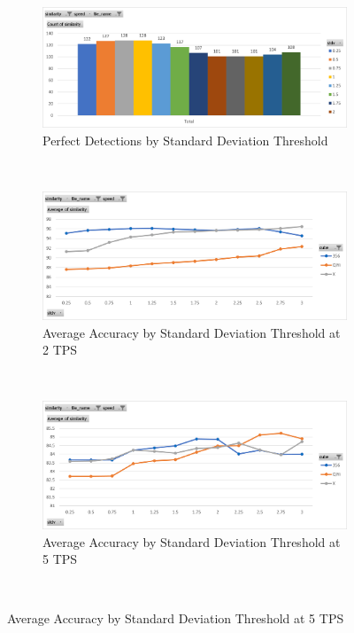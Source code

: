 \begin{figure}
    \caption{Influence of Standard Deviation Threshold on Accuracy}
    \label{fig:influence-stdv-threshold}
    \begin{subfigure}{\textwidth}
        \centering
        \caption{Perfect Detections by Standard Deviation Threshold}
        \label{fig:influence-stdv-threshold-perfect}
        \includegraphics[width=\linewidth]{Figures/7 Evaluation/perfect_detections_by_stdv.png}
        \vspace*{.1mm}
    \end{subfigure}\\
    \begin{subfigure}{\textwidth}
        \centering
        \caption{Average Accuracy by Standard Deviation Threshold at 2 TPS}
        \label{fig:influence-stdv-threshold-average-2tps}
        \includegraphics[width=\linewidth]{Figures/7 Evaluation/similarity_by_stdv_2tps.png}
        \vspace*{.1mm}
    \end{subfigure}\\
    \begin{subfigure}{\textwidth}
        \centering
        \caption{Average Accuracy by Standard Deviation Threshold at 5 TPS}
        \label{fig:influence-stdv-threshold-average-5tps}
        \includegraphics[width=\linewidth]{Figures/7 Evaluation/similarity_by_stdv_5tps.png}
        \vspace*{.1mm}
    \end{subfigure}\\
\end{figure}

